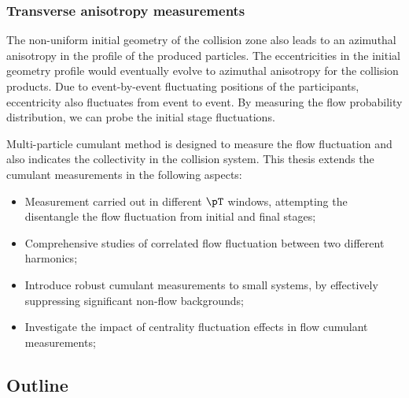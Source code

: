 \subsubsection{Transverse anisotropy measurements}

The non-uniform initial geometry of the collision zone also leads to an azimuthal anisotropy in the profile of the produced particles. The eccentricities in the initial geometry profile would eventually evolve to azimuthal anisotropy for the collision products. Due to event-by-event fluctuating positions of the participants, eccentricity also fluctuates from event to event. By measuring the flow probability distribution, we can probe the initial stage fluctuations.

Multi-particle cumulant method is designed to measure the flow fluctuation and also indicates the collectivity in the collision system. This thesis extends the cumulant measurements in the following aspects:
\begin{itemize}
\item Measurement carried out in different $\pT$ windows, attempting the disentangle the flow fluctuation from initial and final stages;
\item Comprehensive studies of correlated flow fluctuation between two different harmonics;
\item Introduce robust cumulant measurements to small systems, by effectively suppressing significant non-flow backgrounds;
\item Investigate the impact of centrality fluctuation effects in flow cumulant measurements;
\end{itemize}




\subsection{Outline}


